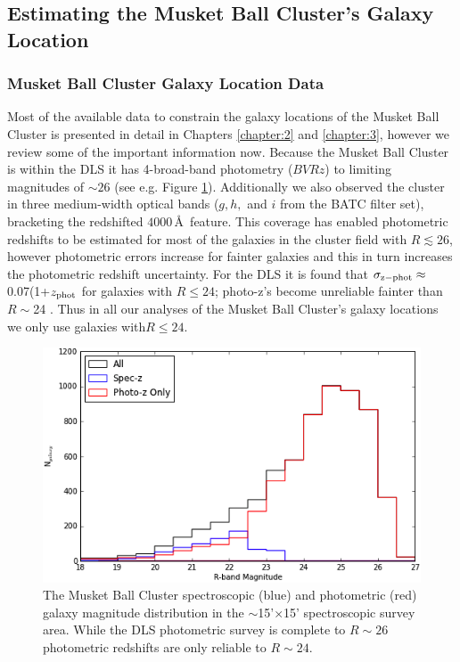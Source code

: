 \subsection{Estimating the Musket Ball Cluster's Galaxy Location}

\subsubsection{Musket Ball Cluster Galaxy Location Data}

Most of the available data to constrain the galaxy locations of the Musket Ball Cluster is presented in detail in Chapters \ref{chapter:2} and \ref{chapter:3}, however we review some of the important information now.
Because the Musket Ball Cluster is within the DLS \citep{Wittman:2002cp} it has 4-broad-band photometry ($BVRz$) to limiting magnitudes of $\sim26$ (see e.g. Figure \ref{figure:PhotozSpeczMagDist}).
Additionally we also observed the cluster in three medium-width optical bands ($g,h,$ and $i$ from the BATC filter set), bracketing the redshifted $4000$\,\AA\, feature.
This coverage has enabled photometric redshifts to be estimated for most of the galaxies in the cluster field with $R\lesssim26$, however photometric errors increase for fainter galaxies and this in turn increases the photometric redshift uncertainty.  
For the DLS it is found that $\sigma_{\rm z-phot}\approx$0.07(1+$z_{\rm phot}$ for galaxies with $R\leq24$; photo-z's become unreliable fainter than $R\sim$24 \citep{Schmidt:2013ig}.
Thus in all our analyses of the Musket Ball Cluster's galaxy locations we only use galaxies with$R\leq24$.

\begin{figure}
	\centering
	\includegraphics[width=5in]{Chapter4/AnalysisFiles/magdist.png}
	\caption[Musket Ball Cluster spectroscopic and photometric magnitude distribution.]{
	The Musket Ball Cluster spectroscopic (blue) and photometric (red) galaxy magnitude distribution in the $\sim$15'$\times$15' spectroscopic survey area.
	While the DLS photometric survey is complete to $R\sim26$ photometric redshifts are only reliable to $R\sim24$.
		}
	\label{figure:PhotozSpeczMagDist}
\end{figure}

